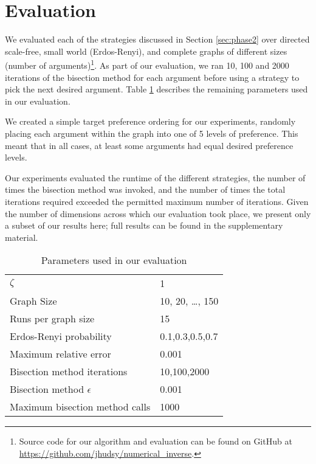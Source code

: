 \documentclass{article}
\begin{document}
\section{Evaluation} \label{sec:eval}

We evaluated each of the strategies discussed in Section \ref{sec:phase2} over directed scale-free, small world (Erdos-Renyi), and complete graphs of different sizes (number of arguments)\footnote{Source code for our algorithm and evaluation can be found on GitHub at \url{https://github.com/jhudsy/numerical_inverse}.}. As part of our evaluation, we ran 10, 100 and 2000 iterations of the bisection method for each argument before using a strategy to pick the next desired argument. Table \ref{tab-parameters} describes the remaining parameters used in our evaluation. 

We created a simple target preference ordering for our experiments, randomly placing each argument within the graph into one of 5 levels of preference. This meant that in all cases, at least some arguments had equal desired preference levels.

Our experiments evaluated the runtime of the different strategies, the number of times the bisection method was invoked, and the number of times the total iterations required exceeded the permitted maximum number of iterations. Given the number of dimensions across which our evaluation took place, we present only a subset of our results here; full results can be found in the supplementary material.

\begin{table}
\centering
\begin{tabular}{|l|l|}
  \hline
  $\zeta$ & 1 \\
  Graph Size   & 10, 20, \ldots, 150 \\
  Runs per graph size & 15 \\
  Erdos-Renyi probability & 0.1,0.3,0.5,0.7 \\
  Maximum relative error   & 0.001 \\
  Bisection method iterations & 10,100,2000 \\
  Bisection method $\epsilon$ & 0.001 \\
  Maximum bisection method calls & 1000 \\%
  \hline
\end{tabular}
\caption{Parameters used in our evaluation}
\label{tab-parameters}
\end{table}
\end{document}
